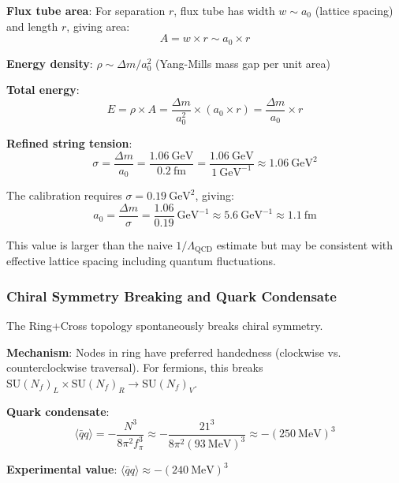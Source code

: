 \documentclass[12pt,a4paper]{article}
\begin{document}
\textbf{Flux tube area}: For separation $r$, flux tube has width $w \sim a_0$ (lattice spacing) and length $r$, giving area:
\begin{equation}
A = w \times r \sim a_0 \times r
\end{equation}

\textbf{Energy density}: $\rho \sim \Delta m / a_0^2$ (Yang-Mills mass gap per unit area)

\textbf{Total energy}:
\begin{equation}
E = \rho \times A = \frac{\Delta m}{a_0^2} \times (a_0 \times r) = \frac{\Delta m}{a_0} \times r
\end{equation}

\textbf{Refined string tension}:
\begin{equation}
\sigma = \frac{\Delta m}{a_0} = \frac{1.06\ \mathrm{GeV}}{0.2\ \mathrm{fm}} = \frac{1.06\ \mathrm{GeV}}{1\ \mathrm{GeV}^{-1}} \approx 1.06\ \mathrm{GeV}^2
\end{equation}

The calibration requires $\sigma = 0.19\ \mathrm{GeV}^2$, giving:
\begin{equation}
a_0 = \frac{\Delta m}{\sigma} = \frac{1.06}{0.19}\ \mathrm{GeV}^{-1} \approx 5.6\ \mathrm{GeV}^{-1} \approx 1.1\ \mathrm{fm}
\end{equation}

This value is larger than the naive $1/\Lambda_{\mathrm{QCD}}$ estimate but may be consistent with effective lattice spacing including quantum fluctuations.

\subsubsection{Chiral Symmetry Breaking and Quark Condensate}

The Ring+Cross topology spontaneously breaks chiral symmetry.

\textbf{Mechanism}: Nodes in ring have preferred handedness (clockwise vs. counterclockwise traversal). For fermions, this breaks $\mathrm{SU}(N_f)_L \times \mathrm{SU}(N_f)_R \to \mathrm{SU}(N_f)_V$.

\textbf{Quark condensate}:
\begin{equation}
\langle \bar{q}q \rangle = -\frac{N^3}{8\pi^2 f_\pi^3} \approx -\frac{21^3}{8\pi^2 (93\ \mathrm{MeV})^3} \approx -(250\ \mathrm{MeV})^3
\end{equation}

\textbf{Experimental value}: $\langle \bar{q}q \rangle \approx -(240\ \mathrm{MeV})^3$
\end{document}
